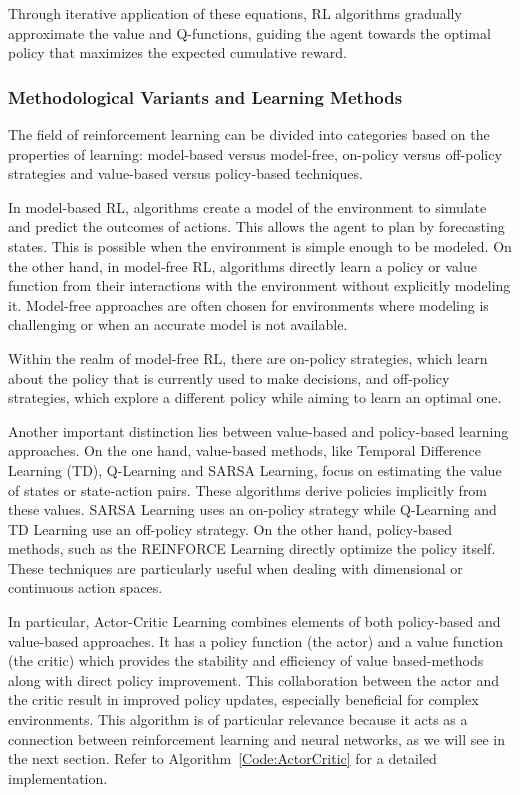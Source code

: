Through iterative application of these equations, RL algorithms gradually approximate the value and Q-functions, guiding the agent towards the optimal policy that maximizes the expected cumulative reward.

\subsubsection{Methodological Variants and Learning Methods}
The field of reinforcement learning can be divided into categories based on the properties of learning: model-based versus model-free, on-policy versus off-policy strategies and value-based versus policy-based techniques.

In model-based RL, algorithms create a model of the environment to simulate and predict the outcomes of actions. This allows the agent to plan by forecasting states. This is possible when the environment is simple enough to be modeled. On the other hand, in model-free RL, algorithms directly learn a policy or value function from their interactions with the environment without explicitly modeling it. Model-free approaches are often chosen for environments where modeling is challenging or when an accurate model is not available.

Within the realm of model-free RL, there are on-policy strategies, which learn about the policy that is currently used to make decisions, and off-policy strategies, which explore a different policy while aiming to learn an optimal one.

Another important distinction lies between value-based and policy-based learning approaches. On the one hand, value-based methods, like Temporal Difference Learning (TD), Q-Learning and SARSA Learning, focus on estimating the value of states or state-action pairs. These algorithms derive policies implicitly from these values. SARSA Learning uses an on-policy strategy while Q-Learning and TD Learning use an off-policy strategy. On the other hand, policy-based methods, such as the REINFORCE Learning directly optimize the policy itself. These techniques are particularly useful when dealing with dimensional or continuous action spaces. 

In particular, Actor-Critic Learning combines elements of both policy-based and value-based approaches. It has a policy function (the actor) and a value function (the critic) which provides the stability and efficiency of value based-methods along with direct policy improvement. This collaboration between the actor and the critic result in improved policy updates, especially beneficial for complex environments. This algorithm is of particular relevance because it acts as a connection between reinforcement learning and neural networks, as we will see in the next section. Refer to Algorithm~\ref{Code:ActorCritic} for a detailed implementation.

